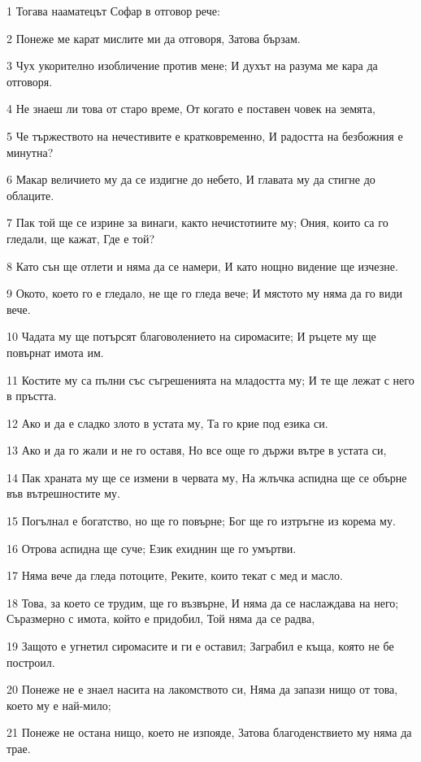 \par 1 Тогава нааматецът Софар в отговор рече:
\par 2 Понеже ме карат мислите ми да отговоря, Затова бързам.
\par 3 Чух укорително изобличение против мене; И духът на разума ме кара да отговоря.
\par 4 Не знаеш ли това от старо време, От когато е поставен човек на земята,
\par 5 Че тържеството на нечестивите е кратковременно, И радостта на безбожния е минутна?
\par 6 Макар величието му да се издигне до небето, И главата му да стигне до облаците.
\par 7 Пак той ще се изрине за винаги, както нечистотиите му; Ония, които са го гледали, ще кажат, Где е той?
\par 8 Като сън ще отлети и няма да се намери, И като нощно видение ще изчезне.
\par 9 Окото, което го е гледало, не ще го гледа вече; И мястото му няма да го види вече.
\par 10 Чадата му ще потърсят благоволението на сиромасите; И ръцете му ще повърнат имота им.
\par 11 Костите му са пълни със съгрешенията на младостта му; И те ще лежат с него в пръстта.
\par 12 Ако и да е сладко злото в устата му, Та го крие под езика си.
\par 13 Ако и да го жали и не го оставя, Но все още го държи вътре в устата си,
\par 14 Пак храната му ще се измени в червата му, На жлъчка аспидна ще се обърне във вътрешностите му.
\par 15 Погълнал е богатство, но ще го повърне; Бог ще го изтръгне из корема му.
\par 16 Отрова аспидна ще суче; Език ехиднин ще го умъртви.
\par 17 Няма вече да гледа потоците, Реките, които текат с мед и масло.
\par 18 Това, за което се трудим, ще го възвърне, И няма да се наслаждава на него; Съразмерно с имота, който е придобил, Той няма да се радва,
\par 19 Защото е угнетил сиромасите и ги е оставил; Заграбил е къща, която не бе построил.
\par 20 Понеже не е знаел насита на лакомството си, Няма да запази нищо от това, което му е най-мило;
\par 21 Понеже не остана нищо, което не изпояде, Затова благоденствието му няма да трае.
